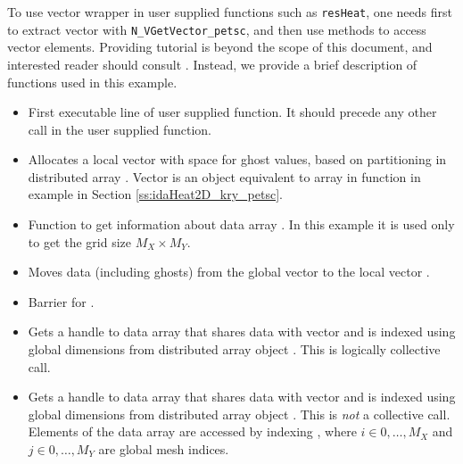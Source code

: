 To use {\petsc} vector wrapper in user supplied functions such as 
\verb|resHeat|, one needs first to extract {\petsc} vector with 
\verb|N_VGetVector_petsc|, and then use {\petsc} methods to access 
vector elements. Providing {\petsc} tutorial is beyond the scope of 
this document, and interested reader should consult \cite{petsc-user-ref}. 
Instead, we provide a brief description of functions used in this example.
\begin{itemize}
\item {}
  \par First executable line of user supplied {\petsc} function. It should 
  precede any other {\petsc} call in the user supplied function.
  
\item {}
  \par Allocates a local vector  with space for ghost values, based 
  on partitioning in distributed array . Vector  is an object 
  equivalent to array  in function  in example
  in Section \ref{ss:idaHeat2D_kry_petsc}.
  
\item {}
  \par Function to get information about data array . In this example
  it is used only to get the grid size $M_X \times M_Y$.
  
\item {}
  \par Moves data (including ghosts) from the global vector  to the 
  local vector . 
  
\item {}
  \par Barrier for .
  
\item {}
  \par Gets a handle to data array  that shares data with vector  and
  is indexed using global dimensions from distributed array object . This is 
  logically collective call.
  
\item {}
  \par Gets a handle to data array  that shares data with vector  and
  is indexed using global dimensions from distributed array object . 
  This is \emph{not} a collective call. Elements of the data array  are 
  accessed by indexing , where $i \in {0,\ldots,M_X}$ and 
  $j \in {0,\ldots,M_Y}$ are global mesh indices.
  

\end{itemize}
